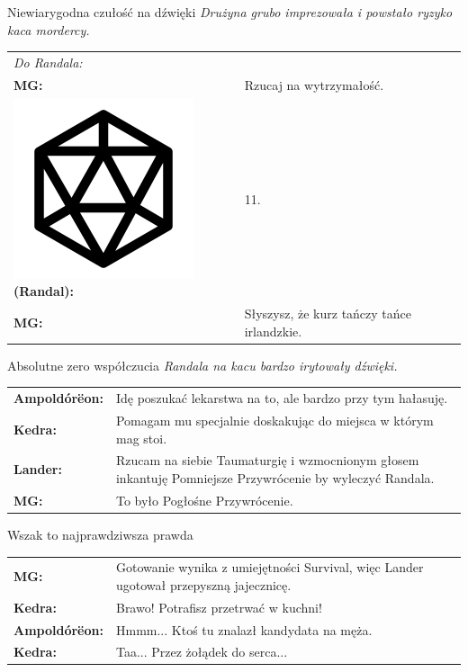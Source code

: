 \documentclass[10pt,twoside,twocolumn]{book}
\begin{document}
\begin{rpg-quotebox}{Niewiarygodna czułość na dźwięki}
   \textit{Drużyna grubo imprezowała i powstało ryzyko kaca mordercy.}\\

   \begin{tabularx}{\columnwidth}{lX}
      \multicolumn{2}{l}{\textit{Do Randala:}}\\
      \textbf{MG:} & Rzucaj na wytrzymałość.\\
      \includegraphics[scale=0.055]{img/d20.png}\textbf{(Randal):}& 11.\\
      \textbf{MG:} & Słyszysz, że kurz tańczy tańce irlandzkie.\\
   \end{tabularx}
\end{rpg-quotebox}


\begin{rpg-quotebox}{Absolutne zero współczucia}
   \textit{Randala na kacu bardzo irytowały dźwięki.}\\

   \begin{tabularx}{\columnwidth}{lX}
      \textbf{Ampoldórëon:} & Idę poszukać lekarstwa na to, ale bardzo przy tym hałasuję.\\
      \textbf{Kedra:} & Pomagam mu specjalnie doskakując do miejsca w którym mag stoi.\\
      \textbf{Lander:} & Rzucam na siebie Taumaturgię i wzmocnionym głosem inkantuję Pomniejsze Przywrócenie by wyleczyć Randala.\\
      \textbf{MG:} & To było Pogłośne Przywrócenie.\\
   \end{tabularx}
\end{rpg-quotebox}


\begin{rpg-quotebox}{Wszak to najprawdziwsza prawda}
   \begin{tabularx}{\columnwidth}{lX}
      \textbf{MG:} & Gotowanie wynika z umiejętności Survival, więc Lander ugotował przepyszną jajecznicę.\\
      \textbf{Kedra:} & Brawo! Potrafisz przetrwać w kuchni!\\
      \textbf{Ampoldórëon:} & Hmmm... Ktoś tu znalazł kandydata na męża.\\
      \textbf{Kedra:} & Taa... Przez żołądek do serca...\\
   \end{tabularx}
\end{rpg-quotebox}
\end{document}
